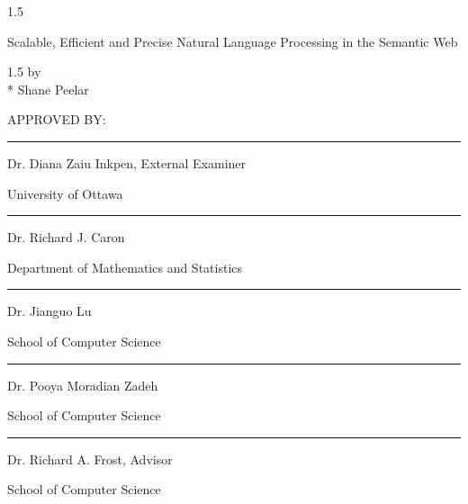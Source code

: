 \documentclass[fleqn, oneside, 12pt]{book}
\theoremstyle{definitionsty}
\newcommand{\uwinonehalfspacelen}{1.5}
\newenvironment{uwinonehalfspaceenv}%
{\begin{spacing}{\uwinonehalfspacelen}}%
	{\end{spacing}}
\newcommand{\dtitle}{Scalable, Efficient and Precise Natural Language Processing in the Semantic Web}
\begin{document}


\clearpage
\thispagestyle{empty}

\begin{center}
	\begin{uwinonehalfspaceenv}
		\parbox{6in}{\centering\dtitle}
	\end{uwinonehalfspaceenv}


	\vspace{0.35cm}
	\begin{uwinonehalfspaceenv}
		by \\*
	{Shane Peelar}
	\end{uwinonehalfspaceenv}



	\vspace{0.5in}

	APPROVED BY:

	\vspace{0.5in}

	\noindent\rule{4in}{0.4pt}

	Dr. Diana Zaiu Inkpen, External Examiner

	University of Ottawa

	\vspace{0.5in}

	\noindent\rule{4in}{0.4pt}

	Dr. Richard J. Caron

	Department of Mathematics and Statistics

	\vspace{0.5in}

	\noindent\rule{4in}{0.4pt}

	Dr. Jianguo Lu

	School of Computer Science

	\vspace{0.5in}

	\noindent\rule{4in}{0.4pt}

	Dr. Pooya Moradian Zadeh

    School of Computer Science

    \vspace{0.5in}

    \noindent\rule{4in}{0.4pt}

	Dr. Richard A. Frost, Advisor

	School of Computer Science

	\vspace{0.5in}

\end{center}
\end{document}
